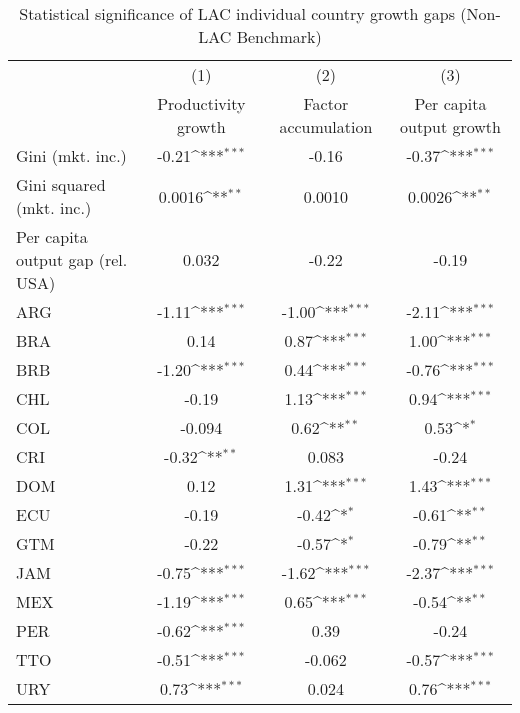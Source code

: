 \begin{table}[htbp]\centering
\def\sym#1{\ifmmode^{#1}\else\(^{#1}\)\fi}
\caption{Statistical significance of LAC individual country growth gaps (Non-LAC Benchmark)}
\begin{tabular}{l*{3}{c}}
\toprule
                &\multicolumn{1}{c}{(1)}&\multicolumn{1}{c}{(2)}&\multicolumn{1}{c}{(3)}\\
                &\multicolumn{1}{c}{Productivity growth}&\multicolumn{1}{c}{Factor accumulation}&\multicolumn{1}{c}{Per capita output growth}\\
\midrule
Gini (mkt. inc.)&    -0.21\sym{***}&    -0.16         &    -0.37\sym{***}\\
Gini squared (mkt. inc.)&   0.0016\sym{**} &   0.0010         &   0.0026\sym{**} \\
Per capita output gap (rel. USA)&    0.032         &    -0.22         &    -0.19         \\
ARG             &    -1.11\sym{***}&    -1.00\sym{***}&    -2.11\sym{***}\\
BRA             &     0.14         &     0.87\sym{***}&     1.00\sym{***}\\
BRB             &    -1.20\sym{***}&     0.44\sym{***}&    -0.76\sym{***}\\
CHL             &    -0.19         &     1.13\sym{***}&     0.94\sym{***}\\
COL             &   -0.094         &     0.62\sym{**} &     0.53\sym{*}  \\
CRI             &    -0.32\sym{**} &    0.083         &    -0.24         \\
DOM             &     0.12         &     1.31\sym{***}&     1.43\sym{***}\\
ECU             &    -0.19         &    -0.42\sym{*}  &    -0.61\sym{**} \\
GTM             &    -0.22         &    -0.57\sym{*}  &    -0.79\sym{**} \\
JAM             &    -0.75\sym{***}&    -1.62\sym{***}&    -2.37\sym{***}\\
MEX             &    -1.19\sym{***}&     0.65\sym{***}&    -0.54\sym{**} \\
PER             &    -0.62\sym{***}&     0.39         &    -0.24         \\
TTO             &    -0.51\sym{***}&   -0.062         &    -0.57\sym{***}\\
URY             &     0.73\sym{***}&    0.024         &     0.76\sym{***}\\

\end{tabular}
\end{table}
